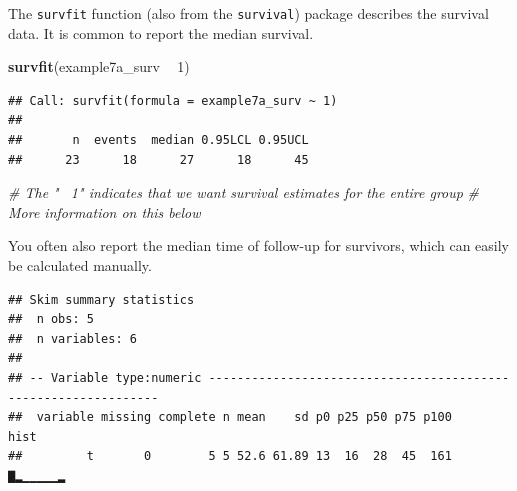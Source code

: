 \documentclass[]{book}
\newenvironment{Shaded}{\begin{snugshade}}{\end{snugshade}}
\newcommand{\CommentTok}[1]{\textcolor[rgb]{0.56,0.35,0.01}{\textit{#1}}}
\newcommand{\DecValTok}[1]{\textcolor[rgb]{0.00,0.00,0.81}{#1}}
\newcommand{\KeywordTok}[1]{\textcolor[rgb]{0.13,0.29,0.53}{\textbf{#1}}}
\newcommand{\NormalTok}[1]{#1}
\newcommand{\OperatorTok}[1]{\textcolor[rgb]{0.81,0.36,0.00}{\textbf{#1}}}
\newcommand{\StringTok}[1]{\textcolor[rgb]{0.31,0.60,0.02}{#1}}
\begin{document}
\begin{Shaded}
\end{Shaded}

The \texttt{survfit} function (also from the \texttt{survival}) package
describes the survival data. It is common to report the median survival.

\begin{Shaded}
\begin{Highlighting}[]
\KeywordTok{survfit}\NormalTok{(example7a_surv }\OperatorTok{~}\StringTok{ }\DecValTok{1}\NormalTok{)}
\end{Highlighting}
\end{Shaded}

\begin{verbatim}
## Call: survfit(formula = example7a_surv ~ 1)
## 
##       n  events  median 0.95LCL 0.95UCL 
##      23      18      27      18      45
\end{verbatim}

\begin{Shaded}
\begin{Highlighting}[]
\CommentTok{# The "~ 1" indicates that we want survival estimates for the entire group}
\CommentTok{# More information on this below}
\end{Highlighting}
\end{Shaded}

You often also report the median time of follow-up for survivors, which
can easily be calculated manually.

\begin{Shaded}
\end{Shaded}

\begin{verbatim}
## Skim summary statistics
##  n obs: 5 
##  n variables: 6 
## 
## -- Variable type:numeric ---------------------------------------------------------------
##  variable missing complete n mean    sd p0 p25 p50 p75 p100     hist
##         t       0        5 5 52.6 61.89 13  16  28  45  161 ▇▂▁▁▁▁▁▂
\end{verbatim}
\end{document}
